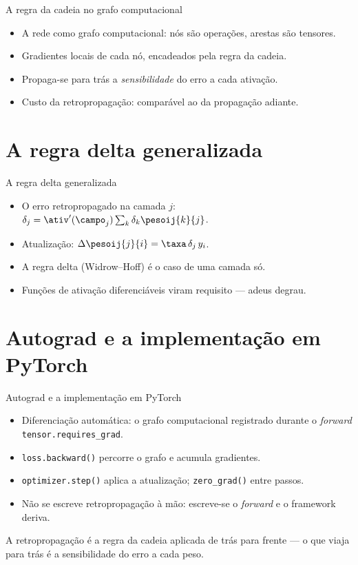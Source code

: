 \documentclass[aspectratio=169, 11pt]{beamer}
\begin{document}
\begin{frame}{A regra da cadeia no grafo computacional}
  \begin{itemize}\setlength{\itemsep}{0.4ex}
    \item A rede como grafo computacional: nós são operações, arestas são tensores.
    \item Gradientes locais de cada nó, encadeados pela regra da cadeia.
    \item Propaga-se para trás a \emph{sensibilidade} do erro a cada ativação.
    \item Custo da retropropagação: comparável ao da propagação adiante.
  \end{itemize}
\end{frame}

\section{A regra delta generalizada}

\begin{frame}{A regra delta generalizada}
  \begin{itemize}\setlength{\itemsep}{0.4ex}
    \item O erro retropropagado na camada $j$: \(\delta_j = \ativ'(\campo_j) \sum_k \delta_k \pesoij{k}{j}\).
    \item Atualização: \(\Delta \pesoij{j}{i} = \taxa\, \delta_j\, y_i\).
    \item A regra delta (Widrow--Hoff) é o caso de uma camada só.
    \item Funções de ativação diferenciáveis viram requisito — adeus degrau.
  \end{itemize}
\end{frame}

\section{Autograd e a implementação em PyTorch}

\begin{frame}{Autograd e a implementação em PyTorch}
  \begin{itemize}\setlength{\itemsep}{0.4ex}
    \item Diferenciação automática: o grafo computacional registrado durante o
          \emph{forward} \texttt{tensor.requires\_grad}.
    \item \texttt{loss.backward()} percorre o grafo e acumula gradientes.
    \item \texttt{optimizer.step()} aplica a atualização; \texttt{zero\_grad()}
          entre passos.
    \item Não se escreve retropropagação à mão: escreve-se o \emph{forward} e o
          framework deriva.
  \end{itemize}
  \begin{ideiabox}
    A retropropagação é a regra da cadeia aplicada de trás para frente — o que
    viaja para trás é a sensibilidade do erro a cada peso.
  \end{ideiabox}
\end{frame}
\end{document}
